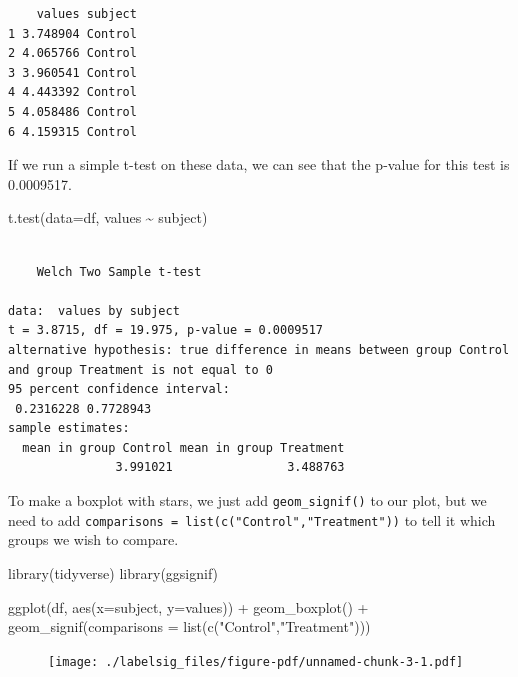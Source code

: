 \documentclass[
  letterpaper,
  DIV=11,
  numbers=noendperiod]{scrreprt}
\newenvironment{Shaded}{\begin{snugshade}}{\end{snugshade}}
\newcommand{\AttributeTok}[1]{\textcolor[rgb]{0.40,0.45,0.13}{#1}}
\newcommand{\FunctionTok}[1]{\textcolor[rgb]{0.28,0.35,0.67}{#1}}
\newcommand{\NormalTok}[1]{\textcolor[rgb]{0.00,0.23,0.31}{#1}}
\newcommand{\SpecialCharTok}[1]{\textcolor[rgb]{0.37,0.37,0.37}{#1}}
\newcommand{\StringTok}[1]{\textcolor[rgb]{0.13,0.47,0.30}{#1}}
\begin{document}
\begin{verbatim}
    values subject
1 3.748904 Control
2 4.065766 Control
3 3.960541 Control
4 4.443392 Control
5 4.058486 Control
6 4.159315 Control
\end{verbatim}

If we run a simple t-test on these data, we can see that the p-value for
this test is 0.0009517.

\begin{Shaded}
\begin{Highlighting}[]
\FunctionTok{t.test}\NormalTok{(}\AttributeTok{data=}\NormalTok{df, values }\SpecialCharTok{\textasciitilde{}}\NormalTok{ subject)}
\end{Highlighting}
\end{Shaded}

\begin{verbatim}

    Welch Two Sample t-test

data:  values by subject
t = 3.8715, df = 19.975, p-value = 0.0009517
alternative hypothesis: true difference in means between group Control and group Treatment is not equal to 0
95 percent confidence interval:
 0.2316228 0.7728943
sample estimates:
  mean in group Control mean in group Treatment 
               3.991021                3.488763 
\end{verbatim}

To make a boxplot with stars, we just add \texttt{geom\_signif()} to our
plot, but we need to add
\texttt{comparisons\ =\ list(c("Control","Treatment"))} to tell it which
groups we wish to compare.

\begin{Shaded}
\begin{Highlighting}[]
\FunctionTok{library}\NormalTok{(tidyverse)}
\FunctionTok{library}\NormalTok{(ggsignif)}

\FunctionTok{ggplot}\NormalTok{(df, }\FunctionTok{aes}\NormalTok{(}\AttributeTok{x=}\NormalTok{subject, }\AttributeTok{y=}\NormalTok{values)) }\SpecialCharTok{+}
  \FunctionTok{geom\_boxplot}\NormalTok{() }\SpecialCharTok{+}
  \FunctionTok{geom\_signif}\NormalTok{(}\AttributeTok{comparisons =} \FunctionTok{list}\NormalTok{(}\FunctionTok{c}\NormalTok{(}\StringTok{"Control"}\NormalTok{,}\StringTok{"Treatment"}\NormalTok{)))}
\end{Highlighting}
\end{Shaded}

\begin{figure}[H]

{\centering \texttt{[image: ./labelsig\_files/figure-pdf/unnamed-chunk-3-1.pdf]}

}

\end{figure}
\end{document}
